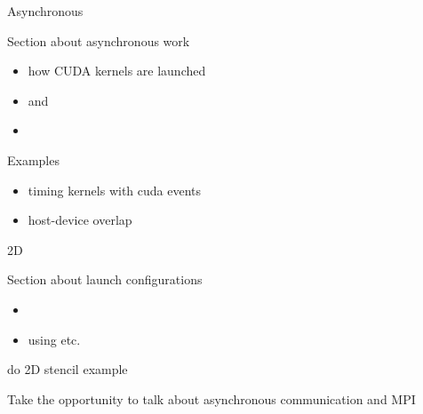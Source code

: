
\begin{frame}[fragile]{Asynchronous}
    \begin{info}{}
        Section about asynchronous work
        \begin{itemize}
            \item how CUDA kernels are launched
            \item {} and 
            \item {}
        \end{itemize}
        Examples
        \begin{itemize}
            \item timing kernels with cuda events
            \item host-device overlap
        \end{itemize}
    \end{info}

\end{frame}


\begin{frame}[fragile]{2D}
    \begin{info}{}
        Section about launch configurations
        \begin{itemize}
            \item {}
            \item using  etc.
        \end{itemize}
        do 2D stencil example

        Take the opportunity to talk about asynchronous communication and MPI
    \end{info}

\end{frame}

